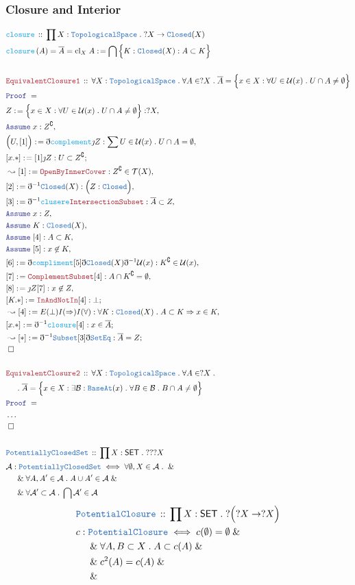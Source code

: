 \documentclass[12pt]{scrartcl}
\newcommand{\TYPE}[1]{\textcolor{NavyBlue}{\mathtt{#1}}}
\newcommand{\FUNC}[1]{\textcolor{Cerulean}{\mathtt{#1}}}
\newcommand{\LOGIC}[1]{\textcolor{Blue}{\mathtt{#1}}}
\newcommand{\THM}[1]{\textcolor{Maroon}{\mathtt{#1}}}
\renewcommand{\.}{\; . \;}
\newcommand{\de}{: \kern 0.1pc =}
\newcommand{\Act}[1]{\left( #1 \right)}
\newcommand{\Theorem}[2]{& \THM{#1} \, :: \, #2 \\ & \Proof = \\ }
\newcommand{\DeclareType}[2]{& \TYPE{#1} \, :: \, #2 \\}
\newcommand{\DefineType}[3]{& #1 : \TYPE{#2} \iff #3 \\}
\newcommand{\DeclareFunc}[2]{& \FUNC{#1} \, :: \, #2 \\}
\newcommand{\DefineNamedFunc}[4]{&  \FUNC{#1}\Act{#2} = #3 \de #4 \\}
\newcommand{\NewLine}{\\ & \kern 1pc}
\newcommand{\Page}[1]{ \begin{align*} #1 \end{align*}   }
\newcommand{ \bd }{ \ByDef }
\newcommand{\NoProof}{ & \ldots \\ \EndProof}
\renewcommand{\And}{\; \& \;}
\newcommand{\Imply}{\Rightarrow}
\renewcommand{\c}{\complement}
\newcommand{\Say}[3]{& #1 \de #2 : #3, \\}
\newcommand{\Conclude}[3]{& #1 \de #2 : #3; \\}
\newcommand{\Derive}[3]{& \leadsto #1 \de #2 : #3, \\}
\newcommand{\DeriveConclude}[3]{& \leadsto #1 \de #2 : #3 ; \\}
\newcommand{\Assume}[2]{& \LOGIC{Assume} \; #1 : #2, \\}
\newcommand{\QED}{\; \square}
\newcommand{\EndProof}{& \QED \\}
\newcommand{\ByDef}{\eth}
\newcommand{\ByConstr}{\jmath}
\newcommand{\Proof}{\LOGIC{Proof} \; }
\newcommand{\A}{\mathcal{A}}
\newcommand{\B}{\mathcal{B}}
\newcommand{\SET}{\mathsf{SET}}
\newcommand{\TS}{\TYPE{TopologicalSpace}}
\newcommand{\T}{\mathcal{T}}
\newcommand{\U}{\mathcal{U}}
\begin{document}
\subsubsection{Closure and Interior}
\Page{
	\DeclareFunc{closure}
	{
		\prod X : \TS \. 
		?X \to \TYPE{Closed}(X) 
	}
	\DefineNamedFunc{closure}{A}{\overline{A} = \mathrm{cl}_X\;A}
	{ \bigcap \Big\{ K : \TYPE{Closed}(X) : A \subset K  \Big\}     }
	\\
	\Theorem{EquivalentClosure1}{
		\forall X : \TS \.
		\forall A \in ?X \.
		\overline{A} = 
		\Big\{x \in X : \forall U \in \U(x) \. U \cap A \neq \emptyset  \Big\}
	}
	\Say{Z}{\Big\{x \in X : \forall U \in \U(x) \. U \cap A \neq \emptyset\Big\}} 
	{?X}
	\Assume{x}{Z^\c}
	\Say{\Big(U,[1]\Big)}{\bd \FUNC{complement}\ByConstr Z}{
		\sum U \in \U(x) \. 
		U \cap A = \emptyset
	}
	\Conclude{[x.*]}{[1]\ByConstr Z}{ U \subset Z^\c}
	\Derive{[1]}{\THM{OpenByInnerCover}}{ Z^\c \in \T(X)  }
	\Say{[2]}{\bd^{-1} \TYPE{Closed}(X)}
	{
		\Big(
			Z : \TYPE{Closed}
		\Big)
	}
	\Say{[3]}{\bd^{-1} \FUNC{clusere} \THM{IntersectionSubset} }
	{
		\overline{A} \subset Z
	}
	\Assume{x}{Z}
	\Assume{K}{\TYPE{Closed}(X)}
	\Assume{[4]}{ A \subset K}
	\Assume{[5]}{x \not \in K}
	\Say{[6]}{\bd \FUNC{compliment}[5]\bd \TYPE{Closed}(X)\bd^{-1} \U(x) }
	{ K^\c \in \U(x)  }
	\Say{[7]}{\THM{ComplementSubset}[4]}{A \cap K^\c = \emptyset}
	\Say{[8]}{\ByConstr Z [7]}{x \not \in Z}
	\Conclude{[K.*]}{\THM{InAndNotIn}[4]}{\bot}
	\Derive{[4]}{E(\bot)I(\Imply)I(\forall)}
	{
		\forall K : \TYPE{Closed}(X) \. A \subset K \Imply x \in K
	}
	\Conclude{[x.*]}{\bd^{-1} \FUNC{closure}[4]}
	{
		x \in \overline{A}
	}
	\DeriveConclude{[*]}{\bd^{-1}\TYPE{Subset}[3]\bd \TYPE{SetEq}}
	{ \overline{A} = Z }
	\EndProof 
	\\
	\Theorem{EquivalentClosure2}{
		\forall X : \TS \.
		\forall A \in ?X \.
		\NewLine \.
		\overline{A} = 
		\Big\{x \in X : \exists \B : \TYPE{BaseAt}(x) \.  \forall B \in \B \.
		B \cap A \neq \emptyset  \Big\}
	}
	\NoProof
	\\
	\DeclareType{PotentiallyClosedSet}
	{
		\prod X : \SET \. ???X		
	}
	\DefineType{\A}{PotentiallyClosedSet}{
		\forall \emptyset, X \in \A \.  \And \NewLine \And
		\forall A,A' \in \A \. A \cup A' \in \A  \And \NewLine \And
		\forall \A' \subset \A \. \bigcap \A' \in \A
	}
}\Page{
	\DeclareType{PotentialClosure}
	{
		\prod X : \SET \. ?\Big(?X \to ?X\Big)
	}	
	\DefineType{c}{PotentialClosure}
	{
		c(\emptyset) = \emptyset \And \NewLine \And
		\forall A,B \subset X \. 
		A \subset c(A) 
		\And \NewLine \And 
		c^2(A) = c(A)
		\And \NewLine \And 
}}
\end{document}
